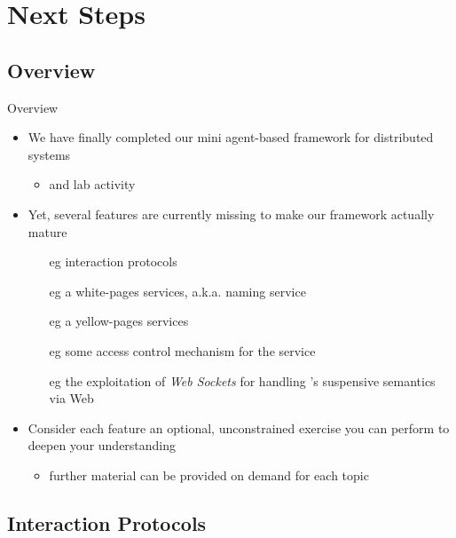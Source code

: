 \documentclass[presentation]{beamer}\mode<presentation>{\usetheme{AMSCesenaPurpleAndGold}}
\begin{document}
\section{Next Steps}

\subsection{Overview}

\begin{frame}{Overview}

	\begin{itemize}
		\item We have finally completed our mini agent-based framework for distributed systems
		\begin{itemize}
			\item and lab activity
		\end{itemize}

		\vfill

		\item Yet, several features are currently missing to make our framework actually mature
		\begin{itemize}
			\item[eg] \fipa{} interaction protocols
			\item[eg] a white-pages services, a.k.a. naming service
			\item[eg] a yellow-pages services 
			\item[eg] some access control mechanism for the \linda{} service 
			\item[eg] the exploitation of \emph{Web Sockets} for handling \linda{}'s suspensive semantics via Web
		\end{itemize}

		\vfill

		\item Consider each feature an \alert{optional}, unconstrained exercise you can perform to deepen your understanding
		\begin{itemize}
			\item further material can be provided on demand for each topic
		\end{itemize}
	\end{itemize}
\end{frame}

\startExercise

\subsection{\fipa{} Interaction Protocols}
\end{document}
